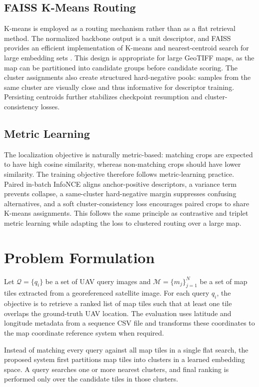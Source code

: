 \documentclass[conference]{IEEEtran}
\begin{document}
\subsection{FAISS K-Means Routing}
K-means is employed as a routing mechanism rather than as a flat retrieval
method. The normalized backbone output is a unit descriptor, and FAISS provides an
efficient implementation of K-means and nearest-centroid search for large
embedding sets \cite{johnson2019billion}. This design is appropriate for large
GeoTIFF maps, as the map can be partitioned into candidate groups before
candidate scoring. The cluster assignments also create structured
hard-negative pools: samples from the same cluster are visually close and
thus informative for descriptor training. Persisting centroids further
stabilizes checkpoint resumption and cluster-consistency losses.

\subsection{Metric Learning}
The localization objective is naturally metric-based: matching crops are
expected to have high cosine similarity, whereas non-matching crops should
have lower similarity. The training objective therefore follows metric-learning
practice. Paired in-batch InfoNCE aligns anchor-positive descriptors, a
variance term prevents collapse, a same-cluster hard-negative margin suppresses
confusing alternatives, and a soft cluster-consistency loss encourages paired
crops to share K-means assignments. This follows the same principle as
contrastive and triplet metric learning
\cite{hadsell2006dimensionality,schroff2015facenet} while adapting the loss to
clustered routing over a large map.

\section{Problem Formulation}
Let $\mathcal{Q}=\{q_i\}$ be a set of UAV query images and
$\mathcal{M}=\{m_j\}_{j=1}^{N}$ be a set of map tiles extracted from a
georeferenced satellite image. For each query $q_i$, the objective is to
retrieve a ranked list of map tiles such that at least one tile overlaps the
ground-truth UAV location. The evaluation uses latitude and longitude
metadata from a sequence CSV file and transforms these coordinates to the map
coordinate reference system when required.

Instead of matching every query against all map tiles in a single flat search,
the proposed system first partitions map tiles into clusters in a learned
embedding space. A query searches one or more nearest clusters, and final
ranking is performed only over the candidate tiles in those clusters.
\end{document}
